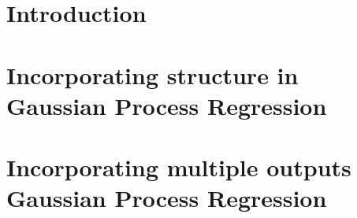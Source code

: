 \documentclass[a4paper,12pt]{book}
\begin{document}




\frontmatter



\clearpage
\tableofcontents

\clearpage
\listoffigures

\clearpage


\clearpage
\lstlistoflistings


\mainmatter
\pagestyle{fancy}

\cleardoublepage

\part{Introduction}\label{partIntroduction}




\part{Incorporating structure in Gaussian Process Regression}\label{partIncorporatePattern}



\part{Incorporating multiple outputs Gaussian Process Regression}\label{partIncorporateMultipleOutputs}



\appendix
%




\clearpage


\cleardoublepage

\end{document}
